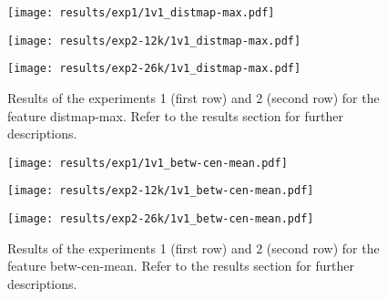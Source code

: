 \begin{figure}[h!]
	\centering
	\begin{minipage}{0.4\linewidth}
		\texttt{[image: results/exp1/1v1\_distmap-max.pdf]}
	\end{minipage}
	
	\begin{minipage}{0.4\linewidth}
		\texttt{[image: results/exp2-12k/1v1\_distmap-max.pdf]}
	\end{minipage}
	\begin{minipage}{0.4\linewidth}
		\texttt{[image: results/exp2-26k/1v1\_distmap-max.pdf]}
	\end{minipage}
	
	\caption[ Results: Feature distmap-max]{ Results of the experiments 1 (first row) and 2 (second row) for the feature distmap-max. Refer to the results section for further descriptions. }
	\label{fig:appendix_distmap-max}
\end{figure}
\newpage 


\begin{figure}[h!]
	\centering
	\begin{minipage}{0.4\linewidth}
		\texttt{[image: results/exp1/1v1\_betw-cen-mean.pdf]}
	\end{minipage}
	
	\begin{minipage}{0.4\linewidth}
		\texttt{[image: results/exp2-12k/1v1\_betw-cen-mean.pdf]}
	\end{minipage}
	\begin{minipage}{0.4\linewidth}
		\texttt{[image: results/exp2-26k/1v1\_betw-cen-mean.pdf]}
	\end{minipage}
	
	\caption[ Results: Feature betw-cen-mean]{ Results of the experiments 1 (first row) and 2 (second row) for the feature betw-cen-mean. Refer to the results section for further descriptions. }
	\label{fig:appendix_betw-cen-mean}
\end{figure}

